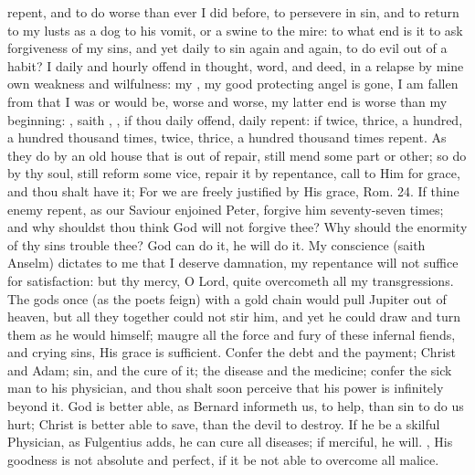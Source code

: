 {repent, and to do worse than ever I did before, to persevere in sin,
and to return to my lusts as a dog to his vomit, or a swine to the
mire: to what end is it to ask forgiveness of my sins, and yet
daily to sin again and again, to do evil out of a habit? I daily and
hourly offend in thought, word, and deed, in a relapse by mine own
weakness and wilfulness: my , my good protecting angel is
gone, I am fallen from that I was or would be, worse and worse, my
latter end is worse than my beginning: ,
saith \Chrysostom{}, , if thou daily offend, daily repent:
if twice, thrice, a hundred, a hundred thousand times, twice,
thrice, a hundred thousand times repent. As they do by an old house
that is out of repair, still mend some part or other; so do by thy
soul, still reform some vice, repair it by repentance, call to Him for
grace, and thou shalt have it; For we are freely justified by His
grace, Rom.  24. If thine enemy repent, as our Saviour enjoined
Peter, forgive him seventy-seven times; and why shouldst thou think God
will not forgive thee? Why should the enormity of thy sins trouble
thee? God can do it, he will do it. My conscience (saith Anselm)
dictates to me that I deserve damnation, my repentance will not suffice
for satisfaction: but thy mercy, O Lord, quite overcometh all my
transgressions. The gods once (as the poets feign) with a gold chain
would pull Jupiter out of heaven, but all they together could not stir
him, and yet he could draw and turn them as he would himself; maugre
all the force and fury of these infernal fiends, and crying sins, His
grace is sufficient. Confer the debt and the payment; Christ and Adam;
sin, and the cure of it; the disease and the medicine; confer the sick
man to his physician, and thou shalt soon perceive that his power is
infinitely beyond it. God is better able, as Bernard informeth
us, to help, than sin to do us hurt; Christ is better able to save,
than the devil to destroy. If he be a skilful Physician, as
Fulgentius adds, he can cure all diseases; if merciful, he will. , His goodness is
not absolute and perfect, if it be not able to overcome all malice.

}
